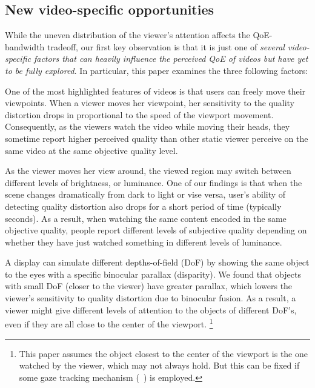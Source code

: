 \subsection{New \vr video-specific opportunities}
\label{subsec:opportunities}

While the uneven distribution of the viewer's attention affects the QoE-bandwidth tradeoff, our first key observation is that it is just one of {\em several \vr video-specific factors that can heavily influence the perceived QoE of \vr videos but have yet to be fully explored}. 
In particular, this paper examines the three following factors:


One of the most highlighted features of \vr videos is that users can freely move their viewpoints. 
When a viewer moves her viewpoint, her sensitivity to the quality distortion drops in proportional to the speed of the viewport movement.
Consequently, as the viewers watch the video while moving their heads, they sometime report higher perceived quality than other static viewer perceive on the same video at the same objective quality level.


As the viewer moves her view around, the viewed region may switch between different levels of brightness, or luminance. 
One of our findings is that when the scene changes dramatically from dark to light or vise versa, user's ability of detecting quality distortion also drops for a short period of time (typically \fillme seconds).
As a result, when watching the same content encoded in the same objective quality, people report different levels of subjective quality depending on whether they have just watched something in different levels of luminance.


 
A \vr display can simulate different depths-of-field (DoF) by showing the same object to the eyes with a specific binocular parallax (disparity). 
We found that objects with small DoF (\ie closer to the viewer) have greater parallax, which lowers the viewer's sensitivity to quality distortion due to binocular fusion.
As a result, a viewer might give different levels of attention to the objects of different DoF's, even if they are all close to the center of the viewport. \footnote{This paper assumes the object closest to the center of the viewport is the one watched by the viewer, which may not always hold. But this can be fixed if some gaze tracking mechanism (\eg~\cite{??,??}) is employed.}






